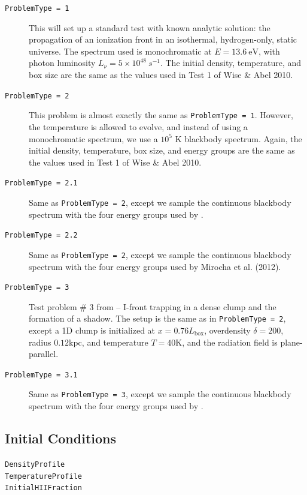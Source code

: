\documentclass[letterpaper,titlepage,12pt]{article}
\numberwithin{equation}{section}
\begin{document}
\begin{description}
    
\item [\texttt{ProblemType = 1}] This will set up a standard test with known analytic solution: the propagation of an ionization front in an isothermal, hydrogen-only, static universe.  The spectrum used is monochromatic at $E = 13.6 \ \text{eV}$, with photon luminosity $L_{\nu} = 5\times 10^{48} \ s^{-1}$.  The initial density, temperature, and box size are the same as the values used in Test 1 of Wise \& Abel 2010. 

\item [\texttt{ProblemType = 2}] This problem is almost exactly the same as \texttt{ProblemType = 1}.  However, the temperature is allowed to evolve, and instead of using a monochromatic spectrum, we use a $10^5$ K blackbody spectrum.  Again, the initial density, temperature, box size, and energy groups are the same as the values used in Test 1 of Wise \& Abel 2010.  

\item [\texttt{ProblemType = 2.1}] Same as \texttt{ProblemType = 2}, except we sample the continuous blackbody spectrum with the four energy groups used by \citet{Wise2011}.

\item [\texttt{ProblemType = 2.2}] Same as \texttt{ProblemType = 2}, except we sample the continuous blackbody spectrum with the four energy groups used by Mirocha et al. (2012).

\item [\texttt{ProblemType = 3}] Test problem \# 3 from \cite{Iliev2006} -- I-front trapping in a dense clump and the formation of a shadow.  The setup is the same as in \texttt{ProblemType = 2}, except a 1D clump is initialized at $x = 0.76 L_{\mathrm{box}}$, overdensity $\delta = 200$, radius $0.12$kpc, and temperature $T = 40$K, and the radiation field is plane-parallel.

\item [\texttt{ProblemType = 3.1}] Same as \texttt{ProblemType = 3}, except we sample the continuous blackbody spectrum with the four energy groups used by \citet{Wise2011}.

\end{description}

\subsection{Initial Conditions}
\begin{description}
    
\item [\texttt{DensityProfile}]  

\item [\texttt{TemperatureProfile}]

\item [\texttt{InitialHIIFraction}]  

\end{description}
\end{document}

